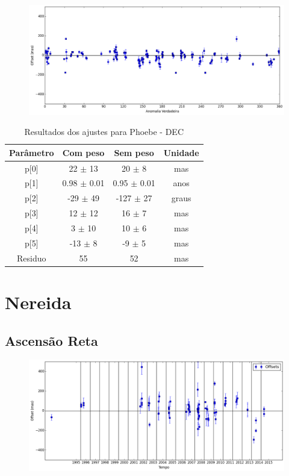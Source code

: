 \documentclass[11pt,a4paper]{report}
\begin{document}
\begin{figure}[h]
\includegraphics[scale=0.45]{Phoebe/DEC_anom.png}  
\end{figure}

\begin{table}[h!]
\caption{\label{Tab: Phoebe-DEC} Resultados dos ajustes para Phoebe - DEC}
\begin{centering}
\begin{tabular}{cccc}
\hline
\hline
Parâmetro & Com peso & Sem peso & Unidade\tabularnewline
\hline
p[0] & 22 $\pm$ 13 & 20 $\pm$ 8 & mas\\
p[1] & 0.98 $\pm$ 0.01 & 0.95 $\pm$ 0.01 & anos\\
p[2] & -29 $\pm$ 49 & -127 $\pm$ 27 & graus\\
p[3] & 12 $\pm$ 12 & 16 $\pm$ 7 & mas\\
p[4] & 3 $\pm$ 10 & 10 $\pm$ 6 & mas\\
p[5] & -13 $\pm$ 8 & -9 $\pm$ 5 & mas\\
Residuo & 55 & 52 & mas\\
\hline 
\end{tabular} 
\par\end{centering}
\end{table}

\chapter*{Nereida}
\section*{Ascensão Reta}

\begin{figure}[h]
\includegraphics[scale=0.45]{Nereida/RA.png} 
\end{figure}
\end{document}
